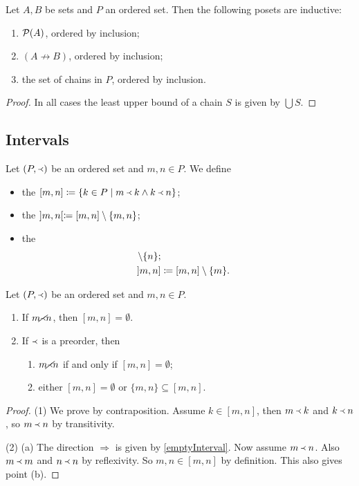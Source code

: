 \begin{proposition} \label{inductive}
Let $A,B$ be sets and $P$ an ordered set. Then the following posets are inductive:
\begin{enumerate}
\item $\operatorname{\mathcal{P}}(A)$, ordered by inclusion;
\item $(A \not\to B)$, ordered by inclusion;
\item the set of chains in $P$, ordered by inclusion.
\end{enumerate}
\end{proposition}
\begin{proof}
In all cases the least upper bound of a chain $S$ is given by $\bigcup S$.
\end{proof}

\subsection{Intervals}
\begin{definition}
Let $(P,\Yleft)$ be an ordered set and $m,n\in P$. We define
\begin{itemize}
\item the  $[m,n] \coloneqq \left\{ k\in P \;\middle|\; m\Yleft k \land k\Yleft n \right\}$;
\item the  $]m,n[ \coloneqq [m,n]\setminus\{m,n\}$;
\item the 
\begin{align*}
[m,n[ &\defeq [m,n]\setminus\{n\}; \\
]m,n] &\defeq [m,n]\setminus\{m\}.
\end{align*}
\end{itemize}
\end{definition}

\begin{lemma} \label{emptyInterval}
Let $(P,\Yleft)$ be an ordered set and $m,n\in P$.
\begin{enumerate}
\item If $m \cancel\Yleft n$, then $[m,n] = \emptyset$.
\item If $\Yleft$ is a preorder, then
\begin{enumerate}
\item $m \cancel\Yleft n$ \textup{if and only if} $[m,n] = \emptyset$;
\item either $[m,n] = \emptyset$ or $\{m,n\} \subseteq [m,n]$.
\end{enumerate}
\end{enumerate}
\end{lemma}
\begin{proof}
(1) We prove by contraposition. Assume $k\in [m,n]$, then $m\Yleft k$ and $k\Yleft n$, so $m\Yleft n$ by transitivity.

(2) (a) The direction $\Rightarrow$ is given by \ref{emptyInterval}. Now assume $m \Yleft n$. Also $m\Yleft m$ and $n \Yleft n$ by reflexivity. So $m,n\in [m,n]$ by definition. This also gives point (b).
\end{proof}


